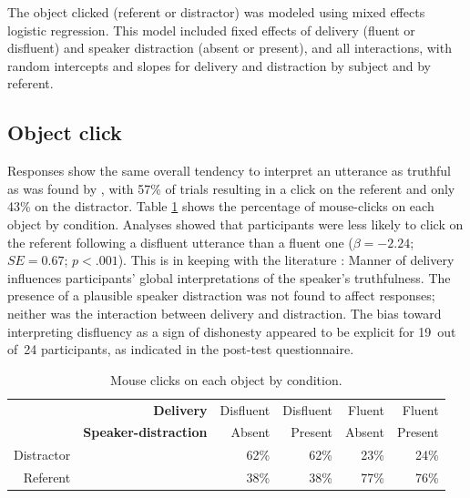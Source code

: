 \documentclass[a4paper,man,natbib]{apa6}
\newcommand*{\SE}{\mathit{SE}} %
\begin{document}
The object clicked (referent or distractor) was modeled using mixed effects logistic regression.
This model included  fixed effects of delivery (fluent or disfluent) and speaker distraction (absent or present), and all interactions, with random intercepts and slopes for delivery and distraction by subject and by referent.

\subsection{Object click}
Responses show the same overall tendency to interpret an utterance as truthful as was found by \citet{Loy2016}, with 57\% of trials resulting in a click on the referent and only 43\% on the distractor.
Table \ref{table:objctclck} shows the percentage of mouse-clicks on each object by condition.
Analyses showed that participants were less likely to click on the referent following a disfluent utterance than a fluent one ($\beta = -2.24$; $\SE = 0.67$; $p<.001$). 
This is in keeping with the literature \citep{depaulo2003cues,Zuckerman1981}:
Manner of delivery influences participants' global interpretations of the speaker's truthfulness. 
The presence of a plausible speaker distraction was not found to affect responses; neither was the interaction between delivery and distraction. 
The bias toward interpreting disfluency as a sign of dishonesty appeared to be explicit for 19~out of~24 participants, as indicated in the post-test questionnaire. 



\begin{table}[ht]
\centering
\caption{Mouse clicks on each object by condition.}
\label{table:objctclck}
\begin{tabular}{rrrrrr}
  \hline
& \textbf{Delivery} & Disfluent & Disfluent & Fluent & Fluent \\ 
& \textbf{Speaker-distraction} & Absent & Present & Absent & Present \\
  \hline
Distractor & &  62\% &  62\% &  23\% &  24\% \\ 
  Referent & &  38\% &  38\% &  77\% &  76\% \\ 
   \hline
\end{tabular}
\end{table}

\end{document}
